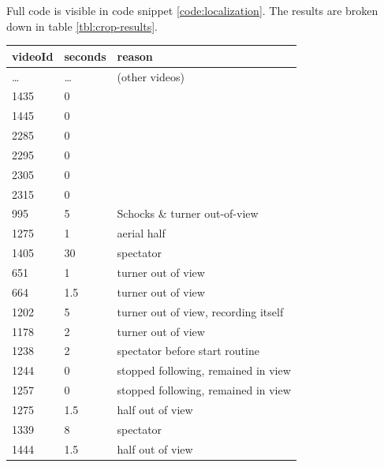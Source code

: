 Full code is visible in code snippet \ref{code:localization}. The results are broken down in table \ref{tbl:crop-results}.


\begin{table}[h!]
    \begin{tabular}{|l|l|l|}
        \hline
        \textbf{videoId} & \textbf{seconds} & \textbf{reason} \\
        \hline
        \dots & \cellcolor{green!25} \dots & (other videos) \\ \hline
        1435 &	\cellcolor{green!25} 0 &	 \\ \hline
        1445 &	\cellcolor{green!25} 0 &	 \\ \hline
        2285 &	\cellcolor{green!25} 0 &	 \\ \hline
        2295 &	\cellcolor{green!25} 0 &	 \\ \hline
        2305 &	\cellcolor{green!25} 0 &	 \\ \hline
        2315 &	\cellcolor{green!25} 0 &	 \\ \hline
        995  &	\cellcolor{yellow!25} 5 &	Schocks \& turner out-of-view \\ \hline
        1275 &	\cellcolor{yellow!25} 1 &	aerial half \\ \hline
        1405 &	\cellcolor{orange!25} 30 &	spectator \\ \hline
        651  &	\cellcolor{yellow!25} 1    &	turner out of view \\ \hline
        664  &	\cellcolor{yellow!25} 1.5  &	turner out of view \\ \hline
        1202 &	\cellcolor{yellow!25} 5    &	turner out of view, recording itself \\ \hline
        1178 &	\cellcolor{yellow!25} 2    &	turner out of view \\ \hline
        1238 &	\cellcolor{yellow!25} 2    &	spectator before start routine \\ \hline
        1244 &	\cellcolor{yellow!25} 0    &	stopped following, remained in view \\ \hline
        1257 &	\cellcolor{yellow!25} 0    &	stopped following, remained in view \\ \hline
        1275 &	\cellcolor{yellow!25} 1.5  &	half out of view \\ \hline
        1339 &	\cellcolor{yellow!25} 8    &  spectator \\ \hline
        1444 &	\cellcolor{yellow!25} 1.5  &	half out of view \\ \hline

\end{tabular}
\end{table}
